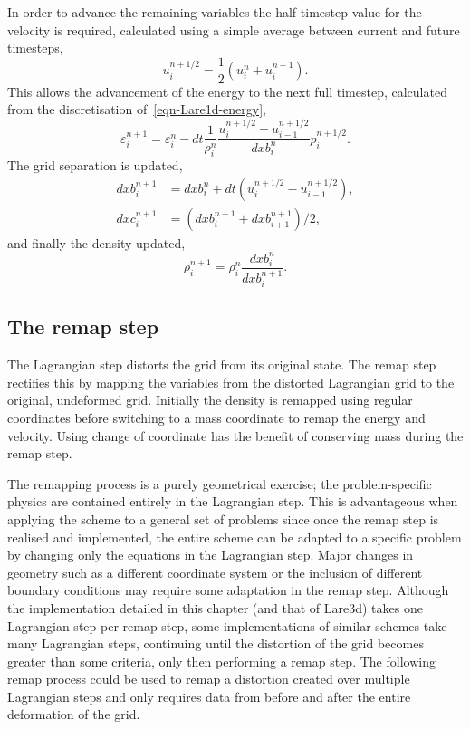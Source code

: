 In order to advance the remaining variables the half timestep value for the velocity is required, calculated using a simple average between current and future timesteps,
\begin{equation}
  u_i^{n+1/2} = \frac{1}{2}(u_i^{n} + u_i^{n+1}).
  \label{}
\end{equation}
This allows the advancement of the energy to the next full timestep, calculated from the discretisation of~\eqref{eqn-Lare1d-energy},
\begin{equation}
  \varepsilon_i^{n+1} = \varepsilon_i^{n} - dt \frac{1}{\rho_i^n} \frac{u_i^{n+1/2} - u_{i-1}^{n+1/2}}{dxb_i^n}p_i^{n+1/2}.
  \label{}
\end{equation}
The grid separation is updated,
\begin{align}
  dxb_i^{n+1} &=  dxb_i^n + dt(u_i^{n+1/2} - u_{i-1}^{n+1/2}),\\
  dxc_i^{n+1} &=  (dxb_i^{n+1} + dxb_{i+1}^{n+1})/2,
  \label{eqn-lagrangian-grid-update}
\end{align}
and finally the density updated,
\begin{equation}
  \rho_i^{n+1} = \rho_i^n \frac{dxb_i^n}{dxb_i^{n+1}}.
  \label{}
\end{equation}

\subsection{The remap step}
The Lagrangian step distorts the grid from its original state. The remap step rectifies this by mapping the variables from the distorted Lagrangian grid to the original, undeformed grid. Initially the density is remapped using regular coordinates before switching to a mass coordinate to remap the energy and velocity. Using change of coordinate has the benefit of conserving mass during the remap step.

The remapping process is a purely geometrical exercise; the problem-specific physics are contained entirely in the Lagrangian step. This is advantageous when applying the scheme to a general set of problems since once the remap step is realised and implemented, the entire scheme can be adapted to a specific problem by changing only the equations in the Lagrangian step. Major changes in geometry such as a different coordinate system or the inclusion of different boundary conditions may require some adaptation in the remap step. Although the implementation detailed in this chapter (and that of Lare3d) takes one Lagrangian step per remap step, some implementations of similar schemes take many Lagrangian steps, continuing until the distortion of the grid becomes greater than some criteria, only then performing a remap step. The following remap process could be used to remap a distortion created over multiple Lagrangian steps and only requires data from before and after the entire deformation of the grid. 

